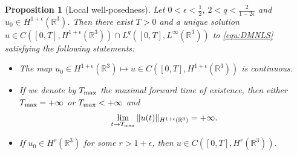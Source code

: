\documentclass[10pt%
]{amsart}
\numberwithin{equation}{section}
\newcommand{\R}{\mathbb{R}}
\newtheorem{proposition}[theorem]{Proposition}
\theoremstyle{definition}
\begin{document}
\begin{proposition}[Local well-posedness]\label{prop:LWP}
	Let $0<\epsilon<\frac12$, $2< q<\frac2{1-2\epsilon}$ and $u_0\in H^{1+\epsilon}(\R^3)$. Then there exist $T>0$ and a unique solution $u\in C([0,T], H^{1+\epsilon}(\R^3))\cap L^q([0,T], L^\infty(\R^3))$ to \eqref{equ:DMNLS} satisfying the following statements: 
	\begin{itemize}
		\item The map $u_0\in H^{1+\epsilon}(\R^3)\mapsto u\in C([0,T], H^{1+\epsilon}(\R^3))$ is continuous. 
		\item If we denote by $T_{\rm max}$ the maximal forward time of existence, then  either  $T_{\rm max}=+\infty$ or $T_{\rm max}<+\infty$ and
		\begin{equation*}%
			\lim_{t\to T_{\rm max}}\|u(t)\|_{H^{1+\epsilon}(\R^3)}=+\infty.
		\end{equation*}
		\item If $u_0\in H^r(\R^3)$ for some $r>1+\epsilon$, then $u\in C([0,T],H^r(\R^3))$. 
	\end{itemize}
\end{proposition}
\end{document}

